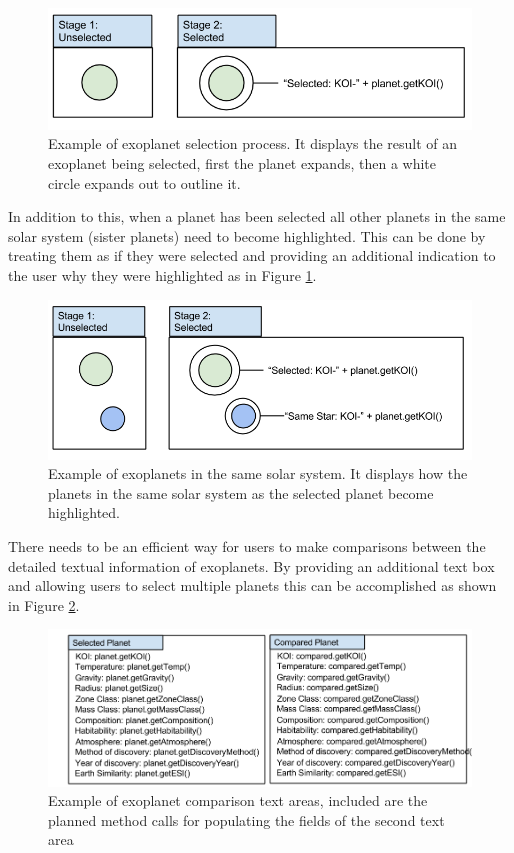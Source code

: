 \begin{enumerate}
\begin{figure}[H]
  \centering
      \includegraphics[width=.8\textwidth]{images/mockSelected.png}
  \caption[Example of exoplanet selection process]{Example of exoplanet
selection process. It displays the result of an exoplanet being selected, first
the planet expands, then a white circle expands out to outline it.}  
\end{figure}

In addition to this, when a planet has been selected all 
other planets in the
same solar system (sister planets) need to become highlighted. This can be done
by treating them as if they were selected and providing an additional indication
 to the user why they were highlighted as in Figure \ref{fig:sister}.  
\begin{figure}[H]
  \centering
      \includegraphics[width=.8\textwidth]{images/selectedSisterPlanets.png}
  \caption[Example of exoplanets in the same solar system]{Example of exoplanets
in the same solar system. It displays how the planets in the same solar system
as the selected planet become highlighted.}  
  \label{fig:sister}
\end{figure}

There needs to be an efficient way for users to make comparisons between the
detailed textual information of exoplanets. By providing an additional text
box and allowing users to select multiple planets this can be accomplished as
shown in Figure \ref{fig:comp}.

\begin{figure}[H]
  \centering
      \includegraphics[width=.7\textwidth]{images/mockComparePlanets.png}
  \caption[Example of exoplanet comparison]{Example of exoplanet comparison
text areas, included are the planned method calls for populating the fields of
the second text area}
  \label{fig:comp}
\end{figure}
\clearpage


\end{enumerate}
